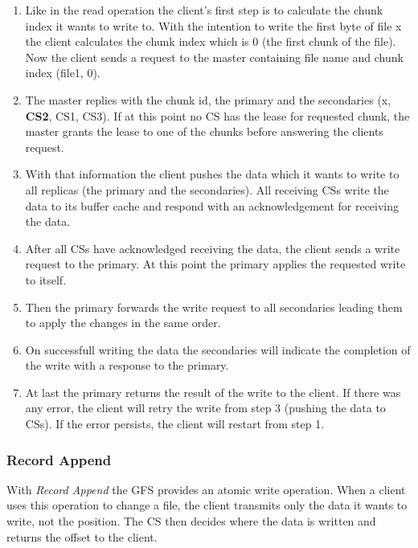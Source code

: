 \documentclass{sig-alternate}
\begin{document}
\begin{enumerate}
\item 
Like in the read operation the client's first step is to calculate the chunk index it wants to write to. With the intention to write the first byte of file x the client calculates the chunk index which is 0 (the first chunk of the file). Now the client sends a request to the master containing file name and chunk index (file1, 0).

\item
The master replies with the chunk id, the primary and the secondaries (x, \textbf{CS2}, CS1, CS3). If at this point no CS has the lease for requested chunk, the master grants the lease to one of the chunks before answering the clients request.

\item
With that information the client pushes the data which it wants to write to all replicas (the primary and the secondaries). All receiving CSs write the data to its buffer cache and respond with an acknowledgement for receiving the data.

\item
After all CSs have acknowledged receiving the data, the client sends a write request to the primary. At this point the primary applies the requested write to itself.

\item
Then the primary forwards the write request to all secondaries leading them to apply the changes in the same order.

\item
On successfull writing the data the secondaries will indicate the completion of the write with a response to the primary.

\item
At last the primary returns the result of the write to the client. If there was any error, the client will retry the write from step 3 (pushing the data to CSs). If the error persists, the client will restart from step 1.

\end{enumerate}

\subsubsection{Record Append}
With \textit{Record Append} the GFS provides an atomic write operation. When a client uses this operation to change a file, the client transmits only the data it wants to write, not the position. The CS then decides where the data is written and returns the offset to the client.
\end{document}
